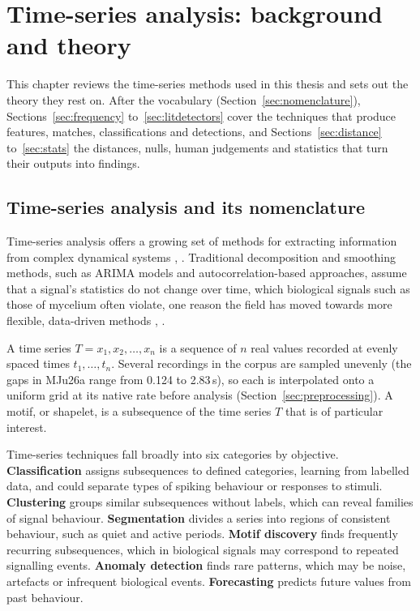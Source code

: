 \chapter{Time-series analysis: background and theory}
\label{ch:litreview}
\label{ch:theory}

This chapter reviews the time-series methods used in this thesis and sets out the theory they rest on. After the vocabulary (Section~\ref{sec:nomenclature}), Sections~\ref{sec:frequency} to~\ref{sec:litdetectors} cover the techniques that produce features, matches, classifications and detections, and Sections~\ref{sec:distance} to~\ref{sec:stats} the distances, nulls, human judgements and statistics that turn their outputs into findings.

\section{Time-series analysis and its nomenclature}
\label{sec:littsa}
\label{sec:nomenclature}

Time-series analysis offers a growing set of methods for extracting information from complex dynamical systems \cite{cabauatan}, \cite{gao}. Traditional decomposition and smoothing methods, such as ARIMA models and autocorrelation-based approaches, assume that a signal's statistics do not change over time, which biological signals such as those of mycelium often violate, one reason the field has moved towards more flexible, data-driven methods \cite{gao}, \cite{milvus}.

A time series $T = x_1, x_2, \ldots, x_n$ is a sequence of $n$ real values recorded at evenly spaced times $t_1, \ldots, t_n$. Several recordings in the corpus are sampled unevenly (the gaps in MJu26a range from 0.124 to 2.83\,s), so each is interpolated onto a uniform grid at its native rate before analysis (Section~\ref{sec:preprocessing}). A motif, or shapelet, is a subsequence of the time series $T$ that is of particular interest.

Time-series techniques fall broadly into six categories by objective. \textbf{Classification} assigns subsequences to defined categories, learning from labelled data, and could separate types of spiking behaviour or responses to stimuli. \textbf{Clustering} groups similar subsequences without labels, which can reveal families of signal behaviour. \textbf{Segmentation} divides a series into regions of consistent behaviour, such as quiet and active periods. \textbf{Motif discovery} finds frequently recurring subsequences, which in biological signals may correspond to repeated signalling events. \textbf{Anomaly detection} finds rare patterns, which may be noise, artefacts or infrequent biological events. \textbf{Forecasting} predicts future values from past behaviour.


